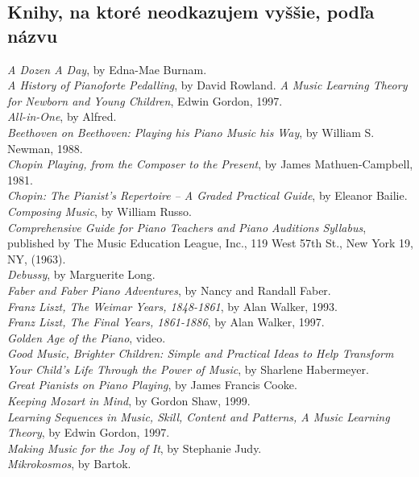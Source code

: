 \subsection*{Knihy, na ktoré neodkazujem vyššie, podľa názvu}
\textit{A Dozen A Day}, by Edna-Mae Burnam.\\
\textit{A History of Pianoforte }\textit{Pedalling}, by David Rowland.
\textit{A Music Learning Theory for Newborn and Young Children}, Edwin Gordon, 1997.\\
\textit{All-in-One}, by Alfred.\\
\textit{Beethoven on Beethoven: Playing his Piano Music his Way}, by William S. Newman, 1988.\\
\textit{Chopin Playing, from the Composer to the Present}, by James Mathuen-Campbell, 1981.\\ \textit{Chopin: The Pianist’s Repertoire – A Graded Practical Guide}, by Eleanor Bailie.\\
\textit{Composing Music}, by William Russo.\\
\textit{Comprehensive Guide for Piano Teachers and Piano Auditions Syllabus}, published by The Music Education League, Inc., 119 West 57th St., New York 19, NY, (1963).\\
\textit{Debussy}, by Marguerite Long.\\
\textit{Faber and Faber Piano Adventures}, by Nancy and Randall Faber.\\
\textit{Franz Liszt, The Weimar Years, 1848-1861}, by Alan Walker, 1993.\\
\textit{Franz Liszt, The Final Years, 1861-1886}, by Alan Walker, 1997.\\
\textit{Golden Age of the Piano}, video.\\
\textit{Good Music, Brighter Children: Simple and Practical Ideas to Help Transform Your Child's Life Through the Power of Music}, by Sharlene Habermeyer.\\
\textit{Great Pianists on Piano Playing}, by James Francis Cooke.\\
\textit{Keeping Mozart in Mind}, by Gordon Shaw, 1999.\\
\textit{Learning Sequences in Music, Skill, Content and Patterns, A Music Learning Theory}, by Edwin Gordon, 1997.\\
\textit{Making Music for the Joy of It}, by Stephanie Judy.\\
\textit{Mikrokosmos}, by Bartok.\\
